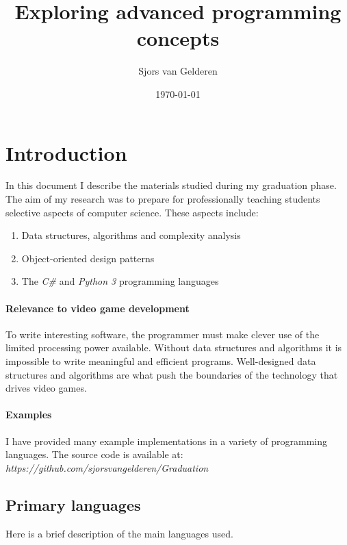 \documentclass{article}
\author{Sjors van Gelderen}
\title{Exploring advanced programming concepts}
\date{\today{}}
\begin{document}
\maketitle{}


\newpage


\tableofcontents{}


\newpage


\section{Introduction}
In this document I describe the materials studied during my graduation phase. The aim of my research was to prepare
for professionally teaching students selective aspects of computer science. These aspects include:
\begin{enumerate}
\item{Data structures, algorithms and complexity analysis}
\item{Object-oriented design patterns}
\item{The {\em C\#} and {\em Python 3} programming languages}
\end{enumerate}

\paragraph{Relevance to video game development}
To write interesting software, the programmer must make clever use of the limited processing power available. Without data
structures and algorithms it is impossible to write meaningful and efficient programs. Well-designed data structures and
algorithms are what push the boundaries of the technology that drives video games.

\paragraph{Examples}
I have provided many example implementations in a variety of programming languages. The source code is available
at: \\ {\em https://github.com/sjorsvangelderen/Graduation}


\newpage


\subsection{Primary languages}
Here is a brief description of the main languages used.
\end{document}
